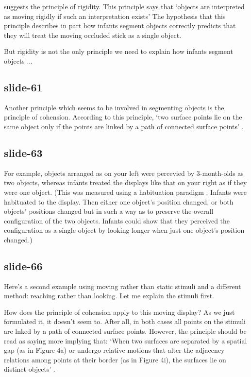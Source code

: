 \documentclass[12pt,\papersize]{extarticle}
\begin{document}
\citet{Spelke:1990jn} suggests the principle of rigidity.
This principle says that ‘objects are interpreted as moving rigidly if such an interpretation 
exists’
The hypothesis that this principle describes in part how infants segment objects correctly
predicts that they will treat the moving occluded stick as a single object.
 
But rigidity is not the only principle we need to explain how infants segment objects ...
 
\subsection{slide-61}
Another principle which seems to be involved in segmenting objects is the principle of 
cohension.
According to this principle, ‘two surface points lie on the same object only if the points are 
linked by a path of connected surface points’ \citep{Spelke:1990jn}.
 
\subsection{slide-63}
For example, objects arranged as on your left were percevied by 3-month-olds as two objects, 
whereas infants treated the displays like that on your right as if they were one object.
(This was measured using a habituation paradigm \citep{kestenbaum:1987_perception}.  Infants 
were habituated to the display.  Then either one object's position changed, or both objects' 
positions changed but in such a way as to preserve the overall configuration of the two 
objects.  Infants could show that they perceived the configuration as a single object by 
looking longer when just one object's position changed.)
 
\subsection{slide-66}
Here's a second example using moving rather than static stimuli and a different method: 
reaching rather than looking.
Let me explain the stimuli first.
 
How does the principle of cohension apply to this moving display? 
As we just formulated it, it doesn't seem to.  After all, in both cases all points on the 
stimuli are lnked by a path of connected surface points.
However, the principle should be read as saying more implying that:
‘When two surfaces are separated by a spatial gap (as in Figure 4a) or undergo relative motions 
that alter the adjacency relations among points at their border (as in Figure 4i), the 
surfaces lie on distinct objects’ \citep[p.\ 49]{Spelke:1990jn}.
 
\end{document}
